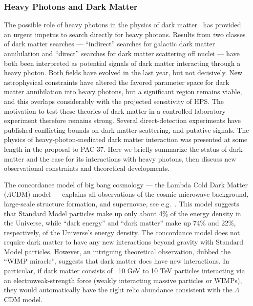 \subsubsection{Heavy Photons and Dark Matter}

The possible role of heavy photons in the physics of dark matter~\cite{ArkaniHamed:2008qn,Pospelov:2008jd} has provided an urgent impetus to search directly for heavy photons.  Results from two classes of dark matter searches --- ``indirect'' searches for galactic dark matter annihilation and ``direct'' searches for dark matter scattering off nuclei --- have both been interpreted as potential signals of dark matter interacting through a heavy photon.  Both fields have evolved in the last year, but not decisively.  New astrophysical constraints have altered the favored parameter space for dark matter annihilation into heavy photons, but a significant region remains viable, and this overlaps considerably with the projected sensitivity of HPS.  The motivation to test these theories of dark matter in a controlled laboratory experiment therefore remains strong.    Several direct-detection experiments have published conflicting bounds on dark matter scattering, and putative signals.  The physics of heavy-photon-mediated dark matter interaction was presented at some length in the proposal to PAC 37.  Here we briefly summarize the status of dark matter and the case for its interactions with heavy photons,  then discuss new observational constraints and theoretical developments.

The concordance model of big bang cosmology --- the Lambda Cold Dark Matter ($\Lambda$CDM) model --- explains all observations of the cosmic microwave background, large-scale structure formation, and supernovae, see 
e.g.~\cite{LambdaCDMData}. This model suggests that Standard Model particles make up only about 4\% of the energy density in the Universe, while ``dark energy'' and ``dark matter'' make up 74\% and 22\%, respectively, of the Universe's energy density. The concordance model does not require dark matter to have any new interactions beyond gravity with Standard Model particles. However, an intriguing theoretical observation, dubbed the ``WIMP miracle'', suggests that dark matter does have new interactions. In particular, if dark matter consists of ~10 GeV to 10 TeV particles interacting via an electroweak-strength force (weakly interacting massive particles or WIMPs), they would automatically have the right relic abundance consistent with the $\Lambda$CDM model.

